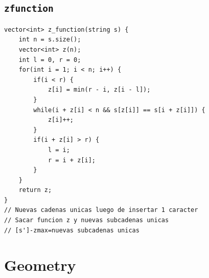 \subsection{\texttt{zfunction}}
\begin{lstlisting}
vector<int> z_function(string s) {
    int n = s.size();
    vector<int> z(n);
    int l = 0, r = 0;
    for(int i = 1; i < n; i++) {
        if(i < r) {
            z[i] = min(r - i, z[i - l]);
        }
        while(i + z[i] < n && s[z[i]] == s[i + z[i]]) {
            z[i]++;
        }
        if(i + z[i] > r) {
            l = i;
            r = i + z[i];
        }
    }
    return z;
}
// Nuevas cadenas unicas luego de insertar 1 caracter
// Sacar funcion z y nuevas subcadenas unicas
// [s']-zmax=nuevas subcadenas unicas\end{lstlisting}

\section{Geometry}

